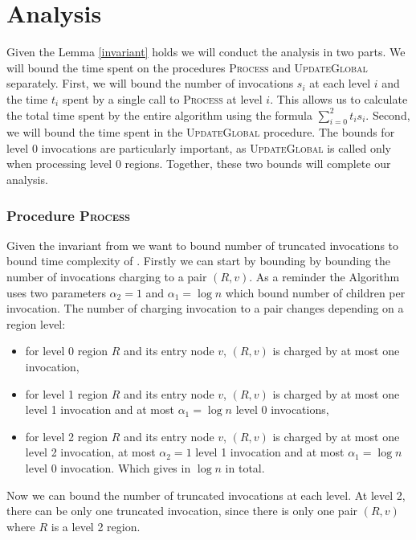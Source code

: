 \section{Analysis}
Given the Lemma \ref{invariant} holds we will conduct the analysis in two parts. We will bound the time spent on the procedures \textsc{Process} and \textsc{UpdateGlobal} separately. First, we will bound the number of invocations $s_i$ at each level $i$ and the time $t_i$ spent by a single call to \textsc{Process} at level $i$. This allows us to calculate the total time spent by the entire algorithm using the formula $\sum_{i=0}^2 t_i s_i$. Second, we will bound the time spent in the \textsc{UpdateGlobal} procedure. The bounds for level 0 invocations are particularly important, as \textsc{UpdateGlobal} is called only when processing level 0 regions. Together, these two bounds will complete our analysis.

\subsubsection{Procedure \textsc{Process}}
Given the invariant from  we want to bound number of truncated invocations to bound time complexity of . Firstly we can start by bounding by bounding the number
of invocations charging to a pair $(R, v)$. As a reminder the Algorithm uses two parameters  $\alpha_2 = 1$ and $\alpha_1 = \log n$ which bound number of children per invocation. The number of charging invocation to a pair changes depending on a region level:
\begin{itemize}
    \item for level 0 region $R$ and its entry node $v$, $(R, v)$ is charged by at most one invocation,
   \item for level 1 region $R$ and its entry node $v$, $(R, v)$ is charged by at most one level 1 invocation and at most $\alpha_1 = \log n$ level 0 invocations,
   \item for level 2 region $R$ and its entry node $v$, $(R, v)$ is charged by at most one level 2 invocation, at most $\alpha_2 = 1$ level 1 invocation and at most $\alpha_1 = \log n$ level 0 invocation. Which gives in $\log n$ in total.
\end{itemize}

Now we can bound the number of truncated invocations at each level.
At level 2, there can be only one truncated invocation, since there is only one pair $(R, v)$ where $R$ is a level 2 region.

